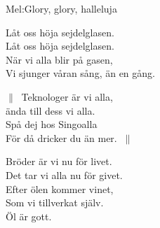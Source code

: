 \begin{SongText}
    \begin{SongInfo}
        Mel:Glory, glory, halleluja
    \end{SongInfo}
    \begin{SongVerse}
        Låt oss höja sejdelglasen.\\%
        Låt oss höja sejdelglasen.\\%
        När vi alla blir på gasen,\\%
        Vi sjunger våran sång, än en gång.
    \end{SongVerse}
    \begin{SongVerse}
        $\|\:$ Teknologer är vi alla,\\%
        ända till dess vi alla.\\%
        Spå dej hos Singoalla\\%
        För då dricker du än mer. $\:\|$
    \end{SongVerse}
    \begin{SongVerse}
        Bröder är vi nu för livet.\\%
        Det tar vi alla nu för givet.\\%
        Efter ölen kommer vinet,\\%
        Som vi tillverkat själv.\\%
        Öl är gott.
    \end{SongVerse}
\end{SongText}
\newpage